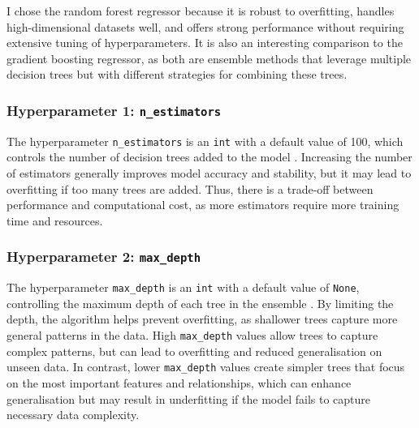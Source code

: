 \documentclass[a4paper]{article}
\begin{document}
I chose the random forest regressor because it is robust to overfitting, handles high-dimensional datasets well, and offers strong performance without requiring extensive tuning of hyperparameters. 
It is also an interesting comparison to the gradient boosting regressor, as both are ensemble methods that leverage multiple decision trees but with different strategies for combining these trees.

\subsubsection{Hyperparameter 1: \texttt{n_estimators}}
The hyperparameter \texttt{n_estimators} is an \texttt{int} with a default value of 100, which controls the number of decision trees added to the model \supercite{scikit_randomforestregressor}. 
Increasing the number of estimators generally improves model accuracy and stability, but it may lead to overfitting if too many trees are added. 
Thus, there is a trade-off between performance and computational cost, as more estimators require more training time and resources.

\subsubsection{Hyperparameter 2: \texttt{max_depth}}
The hyperparameter \texttt{max_depth} is an \texttt{int} with a default value of \texttt{None}, controlling the maximum depth of each tree in the ensemble \supercite{scikit_gradientboostingregressor}. 
By limiting the depth, the algorithm helps prevent overfitting, as shallower trees capture more general patterns in the data.
High \texttt{max_depth} values allow trees to capture complex patterns, but can lead to overfitting and reduced generalisation on unseen data. 
In contrast, lower \texttt{max_depth} values create simpler trees that focus on the most important features and relationships, which can enhance generalisation but may result in underfitting if the model fails to capture necessary data complexity.
\end{document}
